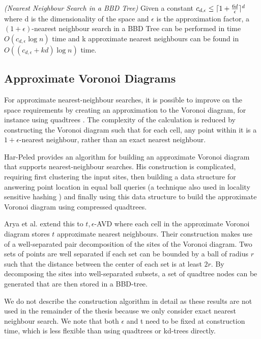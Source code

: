 \documentclass[mcs]{scsthesis}
\begin{document}
\begin{thm} \emph{(Nearest Neighbour Search in a BBD Tree)} 
Given a constant \(c_{d,\epsilon} \le \lceil 1 + {6d \over \epsilon} \rceil^d\)
where d is the dimensionality of the space and \(\epsilon\) is the approximation
factor, a \((1 + \epsilon)\)-nearest neighbour search in a BBD Tree can be
performed in time \(O(c_{d,\epsilon} \log n)\) time and k approximate nearest
neighbours can be found in \(O((c_{d,\epsilon} + kd) \log n)\) time.
\end{thm}

\subsection{Approximate Voronoi Diagrams}

For approximate nearest-neighbour searches, it is possible to improve on the
space requirements by creating an approximation to the Voronoi diagram, for
instance using quadtrees \cite{avd}. The complexity of the calculation is
reduced by constructing the Voronoi diagram such that for each cell, any point
within it is a \(1 + \epsilon\)-nearest neighbour, rather than an exact
nearest neighbour.

Har-Peled \cite{avd} provides an algorithm for building an approximate
Voronoi diagram that supports nearest-neighbour searches. His construction is
complicated, requiring first clustering the input sites, then
building a data structure for answering point location in equal ball queries
(a technique also used in locality sensitive hashing \cite{lsh}) and finally
using this data structure to build the approximate Voronoi diagram using
compressed quadtrees.

Arya et al. \cite{arya-avd} extend this to \(t, \epsilon\)-AVD where each
cell in the approximate Voronoi diagram stores \(t\) approximate nearest
neighbours. Their construction makes use of a well-separated pair
decomposition of the sites of the Voronoi diagram. Two sets of points are well
separated if each set can be bounded by a ball of radius \(r\) such that the
distance between the center of each set is at least \(2r\). By decomposing
the sites into well-separated subsets, a set of quadtree nodes can be
generated that are then stored in a BBD-tree. 

We do not describe the construction algorithm in detail as these results are
not used in the remainder of the thesis because we only consider exact
nearest neighbour search. We note that both \(\epsilon\) and t need to be fixed
at construction time, which is less flexible than using quadtrees or kd-trees
directly.
\end{document}
